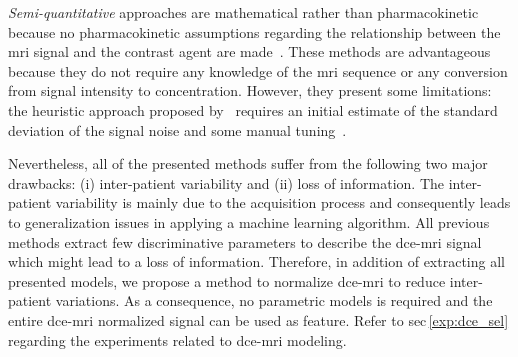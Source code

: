 \documentclass[a4paper,num-refs]{wiley-article}
\begin{document}
\emph{Semi-quantitative} approaches are mathematical rather than
pharmacokinetic because no pharmacokinetic assumptions regarding the
relationship between the \ac{mri} signal and the contrast agent are
made~\cite{huisman2001accurate,gliozzi2011phenomenological}. These methods are
advantageous because they do not require any knowledge of the \ac{mri} sequence
or any conversion from signal intensity to concentration. However, they present
some limitations: the heuristic approach proposed
by~\citeauthor{huisman2001accurate} requires an initial estimate of the
standard deviation of the signal noise and some manual
tuning~\cite{huisman2001accurate}.

Nevertheless, all of the presented methods suffer from the following two major
drawbacks: (i) inter-patient variability and (ii) loss of information. The
inter-patient variability is mainly due to the acquisition process and
consequently leads to generalization issues in applying a machine learning
algorithm. All previous methods extract few discriminative parameters to
describe the \ac{dce}-\ac{mri} signal which might lead to a loss of
information. Therefore, in addition of extracting all presented models, we
propose a method to normalize \ac{dce}-\ac{mri} to reduce inter-patient
variations. As a consequence, no parametric models is required and the entire
\ac{dce}-\ac{mri} normalized signal can be used as feature. Refer to
\acs{sec}\,\ref{exp:dce_sel} regarding the experiments related to
\ac{dce}-\ac{mri} modeling.
\end{document}
